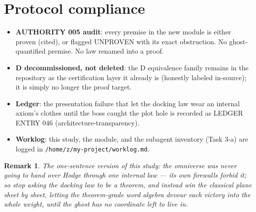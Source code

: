 \documentclass[11pt]{article}
\renewcommand{\_}{\textunderscore\allowbreak}
\newtheorem{remark}[definition]{Remark}
\begin{document}
\section{Protocol compliance}

\begin{itemize}[leftmargin=2em]
\item \textbf{AUTHORITY 005 audit}: every premise in the new module is either
proven (cited), or flagged UNPROVEN with its exact obstruction. No
ghost-quantified premise. No law renamed into a proof.
\item \textbf{D decommissioned, not deleted}: the D equivalence family remains
in the repository as the certification layer it already is (honestly labeled
in-source); it is simply no longer the proof target.
\item \textbf{Ledger}: the presentation failure that let the docking law wear
an internal axiom's clothes until the boss caught the plot hole is recorded
as LEDGER ENTRY 046 (architecture-transparency).
\item \textbf{Worklog}: this study, the module, and the subagent inventory
(Task 3-a) are logged in \texttt{/home/z/my-project/worklog.md}.
\end{itemize}

\begin{remark}
The one-sentence version of this study: \emph{the omniverse was never going
to hand over Hodge through one internal law --- its own firewalls forbid it;
so stop asking the docking law to be a theorem, and instead win the classical
plane sheet by sheet, letting the theorem-grade word algebra devour each
victory into the whole weight, until the ghost has no coordinate left to live
in.}
\end{remark}
\end{document}
